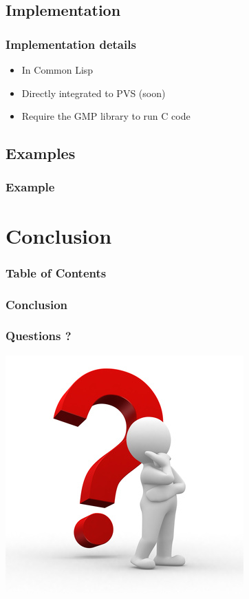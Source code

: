 \documentclass{beamer}
\begin{document}
\subsection{Implementation}

\begin{frame}
\frametitle{Implementation details}
\begin{itemize}
\item In Common Lisp
\item Directly integrated to PVS  (soon)
\item Require the GMP library to run C code
\end{itemize}

\end{frame}


\subsection{Examples}

\begin{frame}
\frametitle{Example}

\end{frame}



\section{Conclusion}
\begin{frame}
\frametitle{Table of Contents}
\tableofcontents[currentsection]
\end{frame}

\begin{frame}
\frametitle{Conclusion}

\end{frame}



\begin{frame}
\frametitle{Questions ?}
\begin{center}
\includegraphics[scale=0.5]{includes/questions.jpg}
\end{center}
\end{frame}
\end{document}
